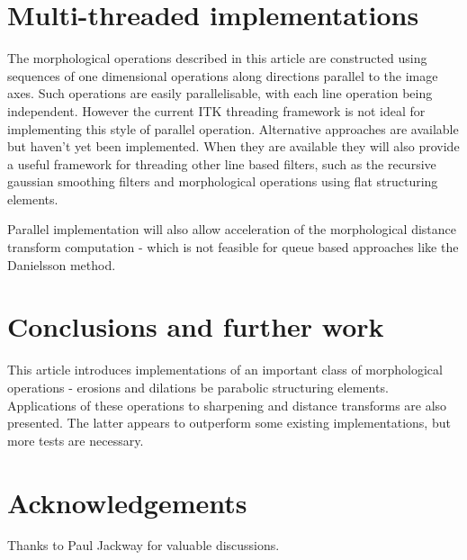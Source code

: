 \documentclass{InsightArticle}
\begin{document}
\section{Multi-threaded implementations}
The morphological operations described in this article are constructed
using sequences of one dimensional operations along directions
parallel to the image axes. Such operations are easily parallelisable,
with each line operation being independent. However the current ITK
threading framework is not ideal for implementing this style of
parallel operation. Alternative approaches are available but haven't
yet been implemented. When they are available they will also provide a
useful framework for threading other line based filters, such as the
recursive gaussian smoothing filters and morphological operations
using flat structuring elements.

Parallel implementation will also allow acceleration of the
morphological distance transform computation - which is not feasible
for queue based approaches like the Danielsson method.


\section{Conclusions and further work}
This article introduces implementations of an important class of
morphological operations - erosions and dilations be parabolic
structuring elements. Applications of these operations to sharpening
and distance transforms are also presented. The latter appears to
outperform some existing implementations, but more tests are
necessary.

\section*{Acknowledgements}
Thanks to Paul Jackway for valuable discussions.



\nocite{ITKSoftwareGuide}
\end{document}
